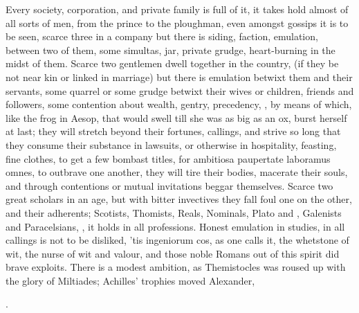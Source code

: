 {Every society, corporation, and private family is full of it, it takes
hold almost of all sorts of men, from the prince to the ploughman, even
amongst gossips it is to be seen, scarce three in a company but there
is siding, faction, emulation, between two of them, some simultas, jar,
private grudge, heart-burning in the midst of them. Scarce two
gentlemen dwell together in the country, (if they be not near kin or
linked in marriage) but there is emulation betwixt them and their
servants, some quarrel or some grudge betwixt their wives or children,
friends and followers, some contention about wealth, gentry,
precedency, \etc{}, by means of which, like the frog in Aesop, that
would swell till she was as big as an ox, burst herself at last; they
will stretch beyond their fortunes, callings, and strive so long that
they consume their substance in lawsuits, or otherwise in hospitality,
feasting, fine clothes, to get a few bombast titles, for ambitiosa
paupertate laboramus omnes, to outbrave one another, they will tire
their bodies, macerate their souls, and through contentions or mutual
invitations beggar themselves. Scarce two great scholars in an age, but
with bitter invectives they fall foul one on the other, and their
adherents; Scotists, Thomists, Reals, Nominals, Plato and \Aristotle,
Galenists and Paracelsians, \etc{}, it holds in all professions.
Honest emulation in studies, in all callings is not to be
disliked, 'tis ingeniorum cos, as one calls it, the whetstone of wit,
the nurse of wit and valour, and those noble Romans out of this spirit
did brave exploits. There is a modest ambition, as Themistocles was
roused up with the glory of Miltiades; Achilles' trophies moved
Alexander,

.

}
